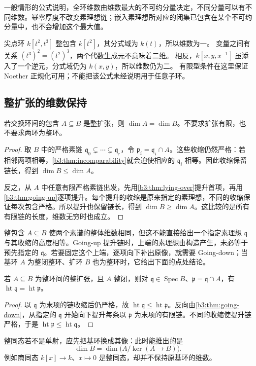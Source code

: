 一般情形的公式说明，全环维数由维数最大的不可约分量决定，不同分量可以有不同维数。幂零厚度不改变素理想链；嵌入素理想所对应的闭集已包含在某个不可约分量中，也不会增加这个最大值。

尖点环 \(k[t^2,t^3]\) 整包含 \(k[t^2]\)，其分式域为 \(k(t)\)，所以维数为一。 变量之间有关系 \((t^3)^2=(t^2)^3\)，两个代数生成元不意味着二维。 相反，\(k[x,y,x^{-1}]\) 虽添入了一个逆元，分式域仍为 \(k(x,y)\)，所以维数仍为二。 有限型条件在这里保证 Noether 正规化可用；不能把该公式未经说明用于任意子环。

\subsection{整扩张的维数保持}
\label{b3:subsec:0903:03}

\begin{theorem}\label{b3:thm:integral-dimension}
	若交换环间的包含 \(A\subseteq B\) 是整扩张，则 \(\dim A=\dim B\)。不要求扩张有限，也不要求两环为整环。
\end{theorem}
\begin{proof}
	取 \(B\) 中的严格素链 \(\mathfrak q_0\subsetneq\cdots\subsetneq\mathfrak q_r\)，令 \(\mathfrak p_i=\mathfrak q_i\cap A\)。这些收缩仍然严格：若相邻两项相等，\cref{b3:thm:incomparability}就会迫使相应的 \(\mathfrak q_i\) 相等。因此收缩保留链长，得到 \(\dim B\le\dim A\)。

	反之，从 \(A\) 中任意有限严格素链出发，先用\cref{b3:thm:lying-over}提升首项，再用\cref{b3:thm:going-up}逐项提升。每个提升的收缩是原来指定的素理想，不同的收缩保证每次包含严格。所以提升也保留链长，得到 \(\dim B\ge\dim A\)。这比较的是所有有限链的长度，维数无穷时也成立。
\end{proof}

整包含 \(A\subseteq B\) 使两个素谱的整体维数相同，但这不能直接给出一个指定素理想 \(\mathfrak q\) 与其收缩的高度相等。Going-up 提升链时，上端的素理想由构造产生，未必等于预先指定的 \(\mathfrak q\)。若要固定这个上端，逐项向下补出原像，就需要 Going-down；当基环 \(A\) 为整闭整环、扩环 \(B\) 也为整环时，它给出下面的点处结论。
\begin{corollary}\label{b3:cor:integral-height-normal-base}
	若 \(A\subseteq B\) 为整环间的整扩张，且 \(A\) 整闭，则对 \(\mathfrak q\in\operatorname{Spec}B\)、\(\mathfrak p=\mathfrak q\cap A\)，有 \(\operatorname{ht}\mathfrak q=\operatorname{ht}\mathfrak p\)。
\end{corollary}
\begin{proof}
	以 \(\mathfrak q\) 为末项的链收缩后仍严格，故 \(\operatorname{ht}\mathfrak q\le\operatorname{ht}\mathfrak p\)。反向由\cref{b3:thm:going-down}，从指定的 \(\mathfrak q\) 开始向下提升每条以 \(\mathfrak p\) 为末项的有限链。不同的收缩使提升链严格，于是 \(\operatorname{ht}\mathfrak p\le\operatorname{ht}\mathfrak q\)。
\end{proof}

整同态若不是单射，应先把基环换成其像：此时能推出的是
\[
	\dim B=\dim\bigl(A/\ker(A\rightarrow B)\bigr).
\]
例如商同态 \(k[x]\rightarrow k\)、\(x\mapsto0\) 是整同态，却并不保持原基环的维数。
